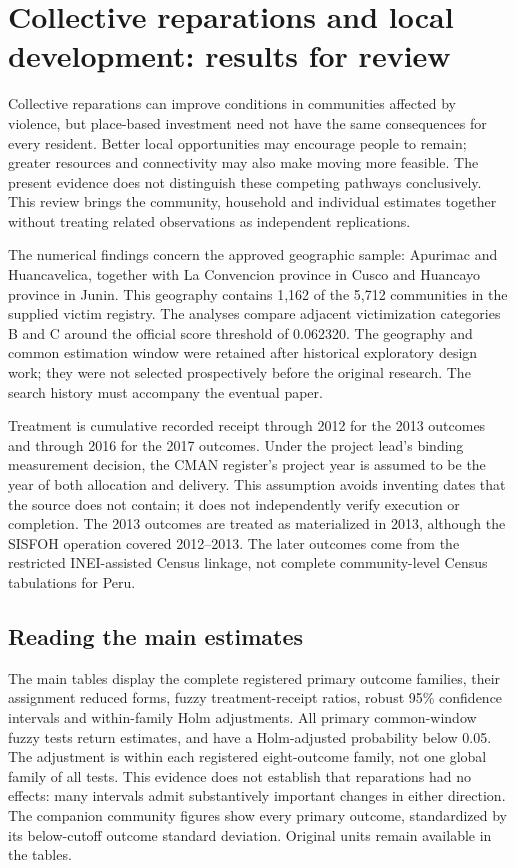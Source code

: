 
\section{Collective reparations and local development: results for review}

Collective reparations can improve conditions in communities affected by
violence, but place-based investment need not have the same consequences for
every resident. Better local opportunities may encourage people to remain;
greater resources and connectivity may also make moving more feasible. The
present evidence does not distinguish these competing pathways conclusively.
This review brings the community, household and individual estimates together
without treating related observations as independent replications.

The numerical findings concern the approved geographic sample: Apurimac and
Huancavelica, together with La Convencion province in Cusco and Huancayo
province in Junin. This geography contains 1,162 of the 5,712 communities in
the supplied victim registry. The analyses compare adjacent victimization
categories B and C around the official score threshold of 0.062320. The
geography and common estimation window were retained after historical
exploratory design work; they were not selected prospectively before the
original research. The search history must accompany the eventual paper.

Treatment is cumulative recorded receipt through 2012 for the 2013 outcomes
and through 2016 for the 2017 outcomes. Under the project lead's binding
measurement decision, the CMAN register's project year is assumed to be the
year of both allocation and delivery. This assumption avoids inventing dates
that the source does not contain; it does not independently verify execution
or completion. The 2013 outcomes are treated as materialized in 2013, although
the SISFOH operation covered 2012--2013. The later outcomes come from the
restricted INEI-assisted Census linkage, not complete community-level Census
tabulations for Peru.

\subsection{Reading the main estimates}

The main tables display the complete registered primary outcome families,
their assignment reduced forms, fuzzy treatment-receipt ratios, robust 95\%
confidence intervals and within-family Holm adjustments. All \PrimaryTests{}
primary common-window fuzzy tests return estimates, and \PrimarySignals{}
have a Holm-adjusted probability below 0.05. The adjustment is within each
registered eight-outcome family, not one global family of all
\PrimaryTests{} tests. This evidence does not establish that reparations had
no effects: many intervals admit substantively important changes in either
direction. The companion community figures show every primary outcome,
standardized by its below-cutoff outcome standard deviation. Original units
remain available in the tables.

